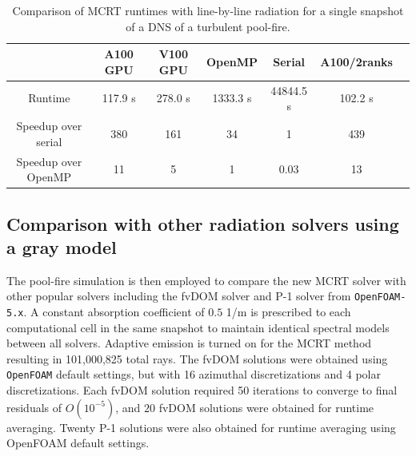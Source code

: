 \begin{table}
\caption{Comparison of MCRT runtimes with line-by-line radiation for a single snapshot of a DNS of a turbulent pool-fire.}
\label{table:PoolFireRuntimes}
\centering
\begin{tabular}{c c c c c c c} 
 \hline
 ~ & A100 GPU & V100 GPU & OpenMP & Serial & A100/2ranks \\ [0.5ex] 
 \hline
 Runtime & 117.9 s & 278.0 s & 1333.3 s & 44844.5 s & 102.2 s \\ 
 Speedup over serial & 380 & 161 & 34 & 1 & 439 \\
 Speedup over OpenMP & 11 & 5 & 1 & 0.03 & 13 \\
 \hline
\end{tabular}
\end{table}



\subsection{Comparison with other radiation solvers using a gray model}


The pool-fire simulation is then employed to compare the new MCRT solver with other popular solvers including the fvDOM solver and P-1 solver from \texttt{OpenFOAM-5.x}. A constant absorption coefficient of $0.5$ 1/m is prescribed to each computational cell in the same snapshot to maintain identical spectral models between all solvers. 
Adaptive emission is turned on for the MCRT method resulting in 101,000,825 total rays. The fvDOM solutions were obtained using \texttt{OpenFOAM} default settings, but with 16 azimuthal discretizations and 4 polar discretizations. 
Each fvDOM solution required 50 iterations to converge to final residuals of $O(10^{-5})$, and $20$ fvDOM solutions were obtained for runtime averaging. Twenty P-1 solutions were also obtained for runtime averaging using OpenFOAM default settings.

